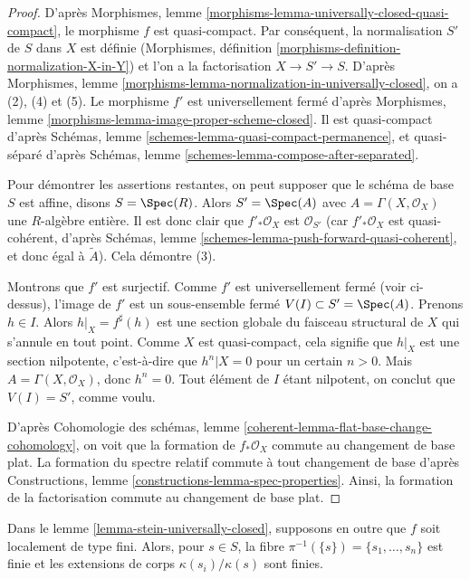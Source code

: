 \begin{proof}
D'après Morphismes, lemme \ref{morphisms-lemma-universally-closed-quasi-compact},
le morphisme $f$ est quasi-compact. Par conséquent, la normalisation $S'$ de $S$ dans
$X$ est définie (Morphismes, définition
\ref{morphisms-definition-normalization-X-in-Y})
et l'on a la factorisation $X \to S' \to S$. D'après
Morphismes, lemme \ref{morphisms-lemma-normalization-in-universally-closed},
on a (2), (4) et (5). Le morphisme $f'$ est universellement fermé d'après
Morphismes, lemme \ref{morphisms-lemma-image-proper-scheme-closed}.
Il est quasi-compact d'après
Schémas, lemme \ref{schemes-lemma-quasi-compact-permanence},
et quasi-séparé d'après
Schémas, lemme \ref{schemes-lemma-compose-after-separated}.

\medskip\noindent
Pour démontrer les assertions restantes, on peut supposer que le schéma de base $S$ est affine,
disons $S = \Spec(R)$. Alors $S' = \Spec(A)$ avec
$A = \Gamma(X, \mathcal{O}_X)$ une $R$-algèbre entière.
Il est donc clair que $f'_*\mathcal{O}_X$
est $\mathcal{O}_{S'}$ (car $f'_*\mathcal{O}_X$ est quasi-cohérent,
d'après
Schémas, lemme
\ref{schemes-lemma-push-forward-quasi-coherent},
et donc égal à $\widetilde{A}$). Cela démontre (3).

\medskip\noindent
Montrons que $f'$ est surjectif. Comme $f'$ est universellement fermé (voir ci-dessus),
l'image de $f'$ est un sous-ensemble fermé
$V(I) \subset S' = \Spec(A)$. Prenons $h \in I$. Alors
$h|_X = f^\sharp(h)$ est une section globale du faisceau structural de
$X$ qui s'annule en tout point. Comme $X$ est quasi-compact, cela signifie
que $h|_X$ est une section nilpotente, c'est-à-dire que $h^n|X = 0$ pour un certain $n > 0$.
Mais $A = \Gamma(X, \mathcal{O}_X)$, donc $h^n = 0$.
Tout élément de $I$ étant nilpotent, on conclut que $V(I) = S'$, comme voulu.

\medskip\noindent
D'après Cohomologie des schémas, lemme \ref{coherent-lemma-flat-base-change-cohomology},
on voit que la formation de $f_*\mathcal{O}_X$ commute au changement de base plat.
La formation du spectre relatif commute à tout changement de base d'après
Constructions, lemme \ref{constructions-lemma-spec-properties}.
Ainsi, la formation de la factorisation commute au changement de base plat.
\end{proof}

\begin{lemma}
\label{lemma-stein-universally-closed-residue-fields}
Dans le lemme \ref{lemma-stein-universally-closed}, supposons en outre que
$f$ soit localement de type fini. Alors, pour $s \in S$, la fibre
$\pi^{-1}(\{s\}) = \{s_1, \ldots, s_n\}$ est finie et les extensions de corps
$\kappa(s_i)/\kappa(s)$ sont finies.
\end{lemma}

